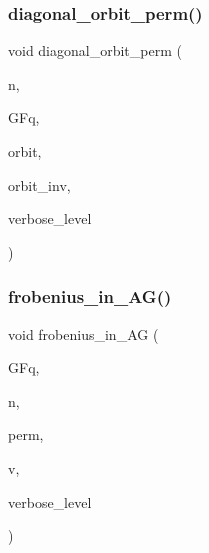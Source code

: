 \mbox{\label{group__generators_8_c_aa6bbdf4744cf75e8f826e454ca163b31}} 
\subsubsection{\texorpdfstring{diagonal\+\_\+orbit\+\_\+perm()}{diagonal\_orbit\_perm()}}
{\footnotesize\ttfamily void diagonal\+\_\+orbit\+\_\+perm (\begin{DoxyParamCaption}\item[{\mbox{\hyperlink{galois_8h_a09fddde158a3a20bd2dcadb609de11dc}{I\+NT}}}]{n,  }\item[{\mbox{\hyperlink{classfinite__field}{finite\+\_\+field}} \&}]{G\+Fq,  }\item[{\mbox{\hyperlink{galois_8h_a09fddde158a3a20bd2dcadb609de11dc}{I\+NT}} $\ast$}]{orbit,  }\item[{\mbox{\hyperlink{galois_8h_a09fddde158a3a20bd2dcadb609de11dc}{I\+NT}} $\ast$}]{orbit\+\_\+inv,  }\item[{\mbox{\hyperlink{galois_8h_a09fddde158a3a20bd2dcadb609de11dc}{I\+NT}}}]{verbose\+\_\+level }\end{DoxyParamCaption})}

\mbox{\label{group__generators_8_c_a1ba574f5a836935be22052736c1f6466}} 
\subsubsection{\texorpdfstring{frobenius\+\_\+in\+\_\+\+A\+G()}{frobenius\_in\_AG()}}
{\footnotesize\ttfamily void frobenius\+\_\+in\+\_\+\+AG (\begin{DoxyParamCaption}\item[{\mbox{\hyperlink{classfinite__field}{finite\+\_\+field}} \&}]{G\+Fq,  }\item[{\mbox{\hyperlink{galois_8h_a09fddde158a3a20bd2dcadb609de11dc}{I\+NT}}}]{n,  }\item[{\mbox{\hyperlink{galois_8h_a09fddde158a3a20bd2dcadb609de11dc}{I\+NT}} $\ast$}]{perm,  }\item[{\mbox{\hyperlink{galois_8h_a09fddde158a3a20bd2dcadb609de11dc}{I\+NT}} $\ast$}]{v,  }\item[{\mbox{\hyperlink{galois_8h_a09fddde158a3a20bd2dcadb609de11dc}{I\+NT}}}]{verbose\+\_\+level }\end{DoxyParamCaption})}

